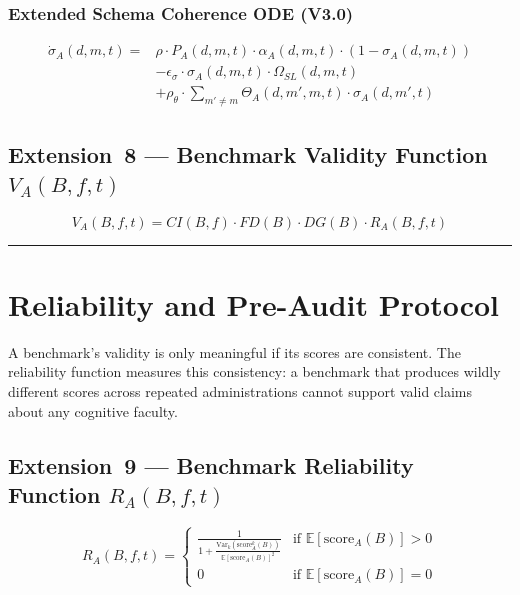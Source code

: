 \documentclass[11pt,a4paper]{article}
\begin{document}
\subsubsection{Extended Schema Coherence ODE (V3.0)}
\begin{equation}\label{eq:sigma-ode-v3}
\begin{aligned}
\dot{\sigma}_A(d,m,t) = {} & \rho \cdot P_A(d,m,t) \cdot \alpha_A(d,m,t) \cdot (1 - \sigma_A(d,m,t)) \\
& - \epsilon_{\sigma} \cdot \sigma_A(d,m,t) \cdot \Omega_{SL}(d,m,t) \\
& + \rho_{\theta} \cdot \sum_{m' \neq m} \Theta_A(d,m',m,t) \cdot \sigma_A(d,m',t)
\end{aligned}
\end{equation}

\subsection{Extension~8 --- Benchmark Validity Function \texorpdfstring{$V_A(B,f,t)$}{V\_A(B,f,t)}}\label{sec:validity}

\begin{equation}\label{eq:validity-function}
V_A(B,f,t) = CI(B,f) \cdot FD(B) \cdot DG(B) \cdot R_A(B,f,t)
\end{equation}

\noindent\rule{\linewidth}{0.4pt}

\section{Reliability and Pre-Audit Protocol}\label{sec:reliability}

A benchmark's validity is only meaningful if its scores are consistent. The reliability function measures this consistency: a benchmark that produces wildly different scores across repeated administrations cannot support valid claims about any cognitive faculty.

\subsection{Extension~9 --- Benchmark Reliability Function \texorpdfstring{$R_A(B,f,t)$}{R\_A(B,f,t)}}\label{sec:reliability-fn}

\begin{equation}\label{eq:reliability}
R_A(B,f,t) = \begin{cases} \displaystyle\frac{1}{1 + \frac{\text{Var}_k(\text{score}_A^k(B))}{\mathbb{E}[\text{score}_A(B)]^2}} & \text{if } \mathbb{E}[\text{score}_A(B)] > 0 \\[8pt] 0 & \text{if } \mathbb{E}[\text{score}_A(B)] = 0 \end{cases}
\end{equation}
\end{document}
